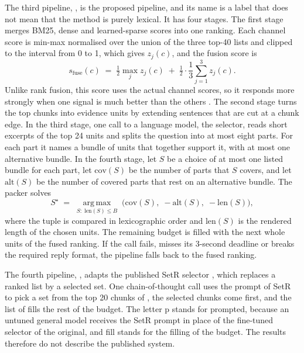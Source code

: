 The third pipeline, \lexb{}, is the proposed pipeline, and its name is a label that does not mean that the method is purely lexical. It has four stages. The first stage merges BM25, dense and learned-sparse scores into one ranking. Each channel score is min-max normalised over the union of the three top-40 lists and clipped to the interval from 0 to 1, which gives $z_j(c)$, and the fusion score is
\begin{equation}
s_{\mathrm{fuse}}(c)\;=\;\tfrac12\max_{j}z_j(c)\;+\;\tfrac12\cdot\frac{1}{3}\sum_{j=1}^{3}z_j(c).
\label{eq:fuse}
\end{equation}
Unlike rank fusion, this score uses the actual channel scores, so it responds more strongly when one signal is much better than the others \citep{bruch2023fusion}. The second stage turns the top chunks into evidence units by extending sentences that are cut at a chunk edge. In the third stage, one call to a language model, the selector, reads short excerpts of the top 24 units and splits the question into at most eight parts. For each part it names a bundle of units that together support it, with at most one alternative bundle. In the fourth stage, let $S$ be a choice of at most one listed bundle for each part, let $\mathrm{cov}(S)$ be the number of parts that $S$ covers, and let $\mathrm{alt}(S)$ be the number of covered parts that rest on an alternative bundle. The packer solves
\begin{equation}
S^{\star}\;=\;\operatorname*{arg\,max}_{S:\;\mathrm{len}(S)\le B}\;\bigl(\mathrm{cov}(S),\;-\mathrm{alt}(S),\;-\mathrm{len}(S)\bigr),
\label{eq:pack}
\end{equation}
where the tuple is compared in lexicographic order and $\mathrm{len}(S)$ is the rendered length of the chosen units. The remaining budget is filled with the next whole units of the fused ranking. If the call fails, misses its 3-second deadline or breaks the required reply format, the pipeline falls back to the fused ranking.

The fourth pipeline, \setr{}, adapts the published SetR selector \citep{lee2025setr}, which replaces a ranked list by a selected set. One chain-of-thought call uses the prompt of SetR to pick a set from the top 20 chunks of \hybrid{}, the selected chunks come first, and the list of \hybrid{} fills the rest of the budget. The letter p stands for prompted, because an untuned general model receives the SetR prompt in place of the fine-tuned selector of the original, and fill stands for the filling of the budget. The results therefore do not describe the published system.

